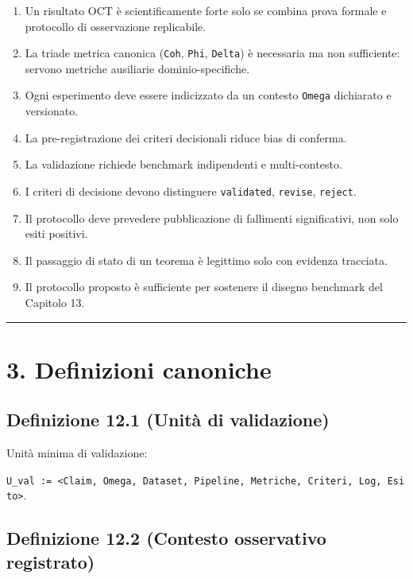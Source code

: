 \begin{enumerate}
\def\labelenumi{\arabic{enumi}.}
\tightlist
\item
  Un risultato OCT è scientificamente forte solo se combina prova formale e protocollo di osservazione replicabile.
\item
  La triade metrica canonica (\texttt{Coh}, \texttt{Phi}, \texttt{Delta}) è necessaria ma non sufficiente: servono metriche ausiliarie dominio-specifiche.
\item
  Ogni esperimento deve essere indicizzato da un contesto \texttt{Omega} dichiarato e versionato.
\item
  La pre-registrazione dei criteri decisionali riduce bias di conferma.
\item
  La validazione richiede benchmark indipendenti e multi-contesto.
\item
  I criteri di decisione devono distinguere \texttt{validated}, \texttt{revise}, \texttt{reject}.
\item
  Il protocollo deve prevedere pubblicazione di fallimenti significativi, non solo esiti positivi.
\item
  Il passaggio di stato di un teorema è legittimo solo con evidenza tracciata.
\item
  Il protocollo proposto è sufficiente per sostenere il disegno benchmark del Capitolo 13.
\end{enumerate}

\begin{center}\rule{0.5\linewidth}{0.5pt}\end{center}

\section{3. Definizioni canoniche}

\subsection{Definizione 12.1 (Unità di validazione)}

Unità minima di validazione:

\texttt{U\_val\ :=\ \textless{}Claim,\ Omega,\ Dataset,\ Pipeline,\ Metriche,\ Criteri,\ Log,\ Esito\textgreater{}}.

\subsection{Definizione 12.2 (Contesto osservativo registrato)}


